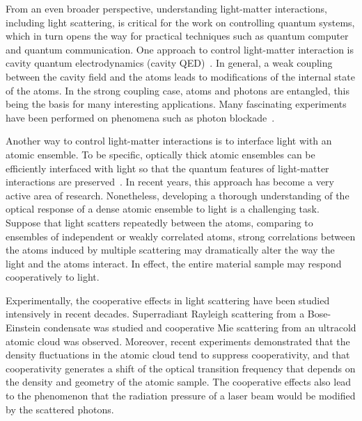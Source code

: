 From an even broader perspective, understanding light-matter interactions, including light scattering, is critical for the work on controlling quantum systems, which in turn opens the way for practical techniques such as quantum computer and quantum communication. One approach to control light-matter interaction is cavity quantum electrodynamics (cavity QED)~\cite{0034-4885-69-5-R02}. In general, a weak coupling between the cavity field and the atoms leads to modifications of the internal state of the atoms. In the strong coupling case, atoms and photons are entangled, this being the basis for many interesting applications.  Many fascinating experiments have been performed on phenomena such as  photon blockade~\cite{photon_blockade}.

Another way to control light-matter interactions is to interface light with an atomic ensemble. To be specific,  optically thick atomic ensembles can be efficiently interfaced with light so that the quantum features of light-matter interactions are preserved~\cite{RevModPhys.82.1041}. In recent years, this approach has become a very active area of research. Nonetheless, developing a thorough understanding of the optical response of a dense atomic ensemble to light is a challenging task. Suppose that light scatters repeatedly between the atoms, comparing to ensembles of independent or weakly correlated atoms, strong correlations between the atoms induced by multiple scattering may dramatically alter the way the light and the atoms interact.  In effect, the entire material sample may respond cooperatively to light.

Experimentally, the cooperative effects in light scattering have been studied intensively in recent decades.  Superradiant Rayleigh scattering from a Bose-Einstein condensate was studied\cite{Inouye23071999,PhysRevLett.83.5202,PhysRevA.62.063615} and cooperative Mie scattering from an ultracold atomic cloud was observed\cite{PhysRevA.82.011404}. Moreover, recent experiments demonstrated that the density fluctuations in the atomic cloud tend to suppress cooperativity\cite{PhysRevLett.104.183602}, and that cooperativity generates a shift of the optical transition frequency that depends on the density and geometry of the atomic sample\cite{PhysRevLett.108.173601}. The cooperative effects also lead to the phenomenon that the radiation pressure of a laser beam would be modified by the scattered photons\cite{Eur.Phys.J.D.58.1}.

